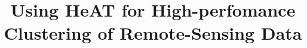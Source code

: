 
\title{
   Using HeAT for High-perfomance Clustering of Remote-Sensing Data
}

\author{%
  \and
}


\maketitle

%
%
\iffalse
    \makeatletter
    \def\ps@IEEEtitlepagestyle{%
      \def\@oddfoot{\mycopyrightnotice}%
      \def\@evenfoot{}%
    }
    \makeatother
    \def\mycopyrightnotice{%
      \begin{minipage}{\textwidth}
        \footnotesize
        1551-3203 \copyright 2015 IEEE.
        Personal use is permitted, but republication/redistribution requires IEEE permission.
        \\
        See \url{https://www.ieee.org/publications_standards/publications/rights/index.html} for more information.
      \end{minipage}
      \gdef\mycopyrightnotice{}%
    }
\fi
